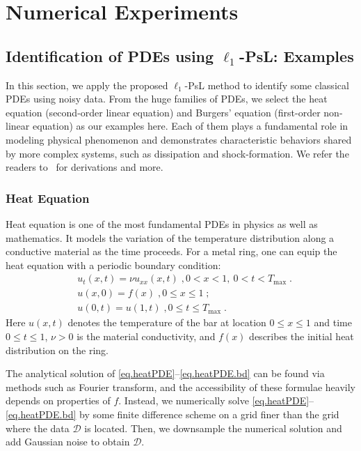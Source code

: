 \documentclass[a4paper,11pt]{article}
\begin{document}
\section{Numerical Experiments}\label{sec.numerical}

\subsection{Identification of PDEs using $\ell_1$-PsL: Examples}
In this section, we apply the proposed $\ell_1$-PsL method to identify some classical PDEs using noisy data. From the huge families of PDEs, we select the heat equation (second-order linear equation) and Burgers' equation (first-order non-linear equation) as our examples here. Each of them plays a fundamental role in modeling physical phenomenon and demonstrates characteristic behaviors shared by more complex systems, such as dissipation and shock-formation. We refer the readers to~\cite{haberman1983elementary} for derivations and more.
\subsubsection{Heat Equation}
Heat equation is one of the most fundamental PDEs in physics as well as mathematics. It models the variation of the temperature distribution along a conductive material as the time proceeds. For a metal ring, one can equip the heat equation with a periodic boundary condition:
\begin{align}
&u_t(x,t) = \nu u_{xx}(x,t)\;,0<x<1,~0<t<T_{\max}\;.\label{eq.heatPDE}\\
&u(x,0)=f(x)\;, 0\leq x\leq 1\;;\label{eq.heatPDE.ival}\\
&u(0,t)=u(1,t)\;,0\leq t\leq T_{\max}\label{eq.heatPDE.bd}\;.
\end{align}
Here $u(x,t)$ denotes the temperature of the bar at location $0\leq x\leq 1 $ and time $0\leq t\leq 1$, $\nu>0$ is the material conductivity, and $f(x)$ describes the initial heat distribution on the ring.

The analytical solution of \eqref{eq.heatPDE}--\eqref{eq.heatPDE.bd} can be found via methods such as Fourier transform, and the accessibility of these formulae heavily depends on properties of $f$. Instead, we numerically solve \eqref{eq.heatPDE}--\eqref{eq.heatPDE.bd} by some finite difference scheme on a grid finer than the grid where the data $\mathcal{D}$ is located. Then, we downsample the numerical solution and add Gaussian noise to obtain $\mathcal{D}$.
\end{document}
